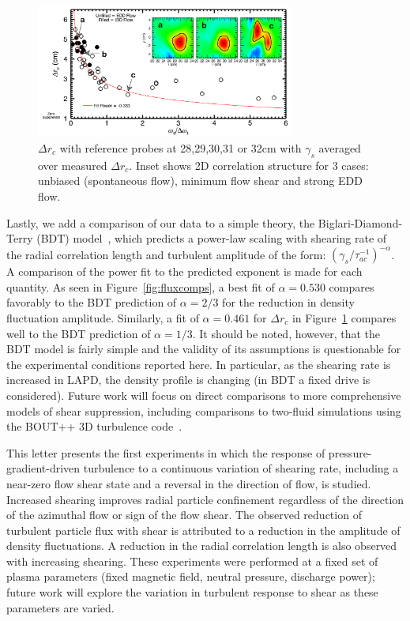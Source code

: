 \documentclass[aps,prl,amsmath,amssymb,preprint,superscriptaddress]{revtex4}
\begin{document}
\begin{figure}[!htbp]
\centerline{
\includegraphics[width=8.5cm]{radcorr}}
\caption{\label{fig:radcorr} $\Delta r_{c}$ with
  reference probes at 28,29,30,31 or 32cm with $\gamma_{s}$ averaged over measured $\Delta r_{c}$.  Inset shows 2D correlation
  structure for 3 cases: unbiased (spontaneous flow), minimum flow
  shear and strong EDD flow.}
\end{figure}

Lastly, we add a comparison of our data to a simple theory, the
Biglari-Diamond-Terry (BDT) model~\cite{biglari90}, which predicts a
power-law scaling with shearing rate of the radial correlation length and turbulent
amplitude of the form: $\left(\gamma_{s}/\tau_{ac}^{-1}\right)^{-\alpha}$. A comparison of the power fit to the
predicted exponent is made for each quantity. As seen in
Figure~\ref{fig:fluxcomps}, a best fit of $\alpha = 0.530$ compares
favorably to the BDT prediction of $\alpha = 2/3$ for the reduction in
density fluctuation amplitude. Similarly, a fit of $\alpha = 0.461$
for $\Delta r_{c}$ in Figure~\ref{fig:radcorr} compares well to the BDT
prediction of $\alpha = 1/3$.   It should be noted, however, that the
BDT model is fairly simple and the validity of its assumptions is
questionable for the experimental conditions reported here.  In
particular, as the shearing rate is increased in LAPD, the density
profile is changing (in BDT a fixed drive is considered).  Future work
will focus on direct comparisons to more comprehensive models of shear
suppression, including comparisons to two-fluid simulations using the
BOUT++ 3D turbulence code~\cite{umansky11}.  

This letter presents the first experiments in which the response of
pressure-gradient-driven turbulence to a continuous
variation of shearing rate, including a near-zero flow shear state and
a reversal in the direction of flow, is studied.  Increased shearing
improves radial particle confinement regardless of the direction of
the azimuthal flow or sign of the flow shear. The observed reduction of
turbulent particle flux with shear is attributed to a reduction in the
amplitude of density fluctuations.  A reduction in the radial
correlation length is also observed with increasing shearing. These
experiments were performed at a fixed set of plasma parameters (fixed
magnetic field, neutral pressure, discharge power); future work will
explore the variation in turbulent response to shear as these
parameters are varied.  
\end{document}
